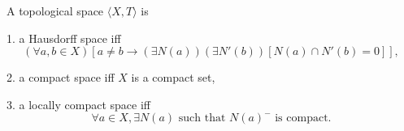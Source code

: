A topological space $\langle X, T \rangle$ is

1. a Hausdorff space iff
   $$(\forall a, b \in X) [a \neq b \rightarrow (\exists N(a)) (\exists N'(b)) [N(a) \cap N'(b) = 0]],$$

2. a compact space iff $X$ is a compact set,

3. a locally compact space iff
   $$\forall a \in X, \exists N(a) \text{ such that } N(a)^- \text{ is compact}.$$
